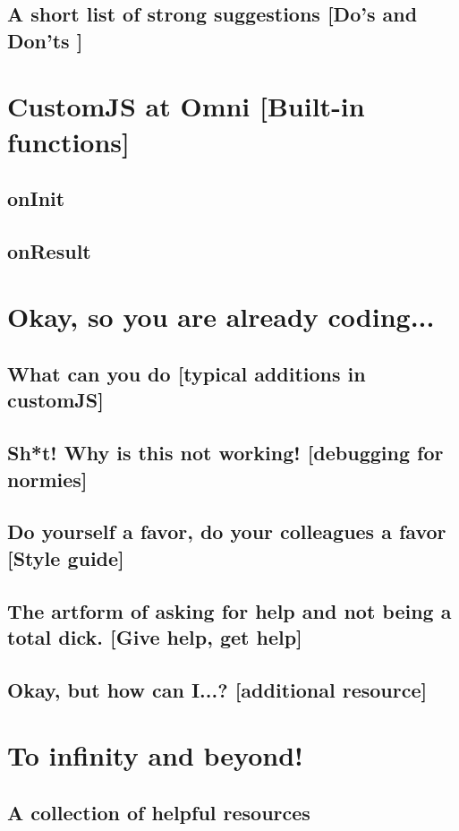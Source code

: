 \documentclass[11pt,a4paper,oldfontcommands]{memoir}
\begin{document}
    \section{A short list of strong suggestions \small{[Do's and Don'ts ]}}
        \label{sec:suggestions}
        

\chapter{CustomJS at Omni \small{[Built-in functions]}}
    \label{chap:omni}
    
    \section{onInit}
    \label{sec:onInit}
    
    
    \section{onResult}
    \label{sec:onResult}
    

\chapter{Okay, so you are already coding...}
    \label{chap:coding}

    \section{What can you do \small{[typical additions in customJS]}}
    \label{sec:whatDo}
    
    
    \section{Sh*t! Why is this not working! \small{[debugging for normies]}}
    \label{sec:debug}
    
    
    \section{Do yourself a favor, do your colleagues a favor \small{[Style guide]}}
    \label{sec:style}
    
    
    \section{The artform of asking for help and not being a total dick. \small{[Give help, get help]}}
    \label{sec:help}
    
    

\section{Okay, but how can I...? \small{[additional resource]}}


\appendix

\chapter{To infinity and beyond!}
\section{A collection of helpful resources}




\end{document}
